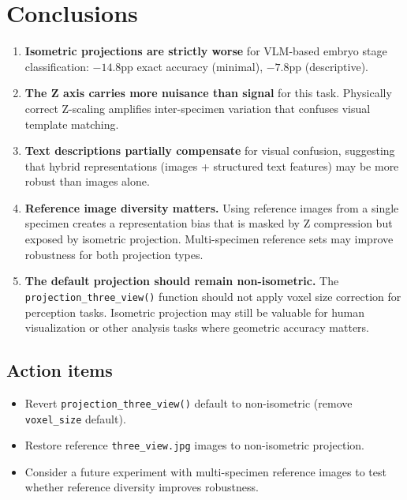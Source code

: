 \documentclass[11pt, a4paper]{article}
\begin{document}
\section{Conclusions}

\begin{enumerate}[leftmargin=*, itemsep=4pt]
  \item \textbf{Isometric projections are strictly worse} for VLM-based embryo
    stage classification: $-14.8$pp exact accuracy (minimal), $-7.8$pp
    (descriptive).

  \item \textbf{The Z axis carries more nuisance than signal} for this task.
    Physically correct Z-scaling amplifies inter-specimen variation that
    confuses visual template matching.

  \item \textbf{Text descriptions partially compensate} for visual confusion,
    suggesting that hybrid representations (images + structured text features)
    may be more robust than images alone.

  \item \textbf{Reference image diversity matters.}  Using reference images
    from a single specimen creates a representation bias that is masked by Z
    compression but exposed by isometric projection.  Multi-specimen reference
    sets may improve robustness for both projection types.

  \item \textbf{The default projection should remain non-isometric.}  The
    \texttt{projection\_three\_view()} function should not apply voxel size
    correction for perception tasks.  Isometric projection may still be
    valuable for human visualization or other analysis tasks where geometric
    accuracy matters.
\end{enumerate}

\subsection{Action items}

\begin{itemize}[leftmargin=*, itemsep=2pt]
  \item Revert \texttt{projection\_three\_view()} default to non-isometric
    (remove \texttt{voxel\_size} default).
  \item Restore reference \texttt{three\_view.jpg} images to non-isometric
    projection.
  \item Consider a future experiment with multi-specimen reference images to
    test whether reference diversity improves robustness.
\end{itemize}
\end{document}
